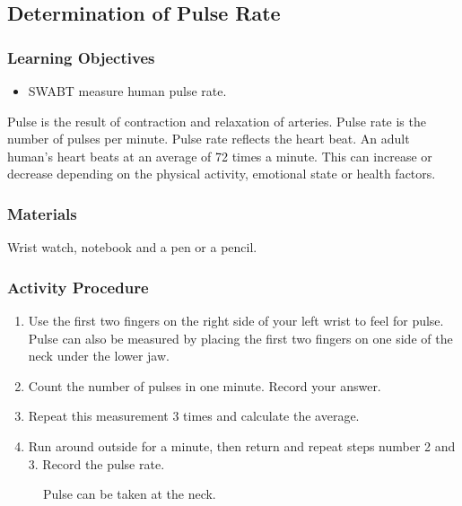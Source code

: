 \subsection{Determination of Pulse Rate}

\subsubsection*{Learning Objectives}
\begin{itemize}
\item{SWABT measure human pulse rate.}
\end{itemize}


Pulse is the result of contraction and relaxation of arteries. Pulse rate is the number of pulses per minute. Pulse rate reflects the heart beat. An adult human's heart beats at an average of 72 times a minute. This can increase or decrease depending on the physical activity, emotional state or health factors.

\subsubsection*{Materials}
Wrist watch, notebook and a pen or a pencil.

\subsubsection*{Activity Procedure}
\begin{enumerate}
\item{Use the first two fingers on the right side of your left wrist to feel for pulse. Pulse can also be measured by placing the first two fingers on one side of the neck under the lower jaw.}
\item{Count the number of pulses in one minute. Record your answer.}
\item{Repeat this measurement 3 times and calculate the average.}
\item{Run around outside for a minute, then return and repeat steps number 2 and 3. Record the pulse rate.}
\end{enumerate}

\begin{figure}[h]
\begin{center}
\def\svgwidth{3cm}

\caption{Pulse can be taken at the neck.}
\label{fig:pulse-1}
\end{center}
\end{figure}

